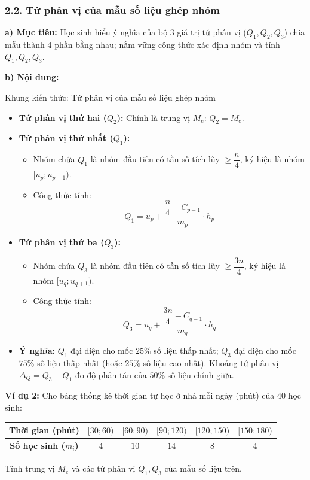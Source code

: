 \documentclass[12pt, a4paper]{article}
\begin{document}
\subsubsection*{2.2. Tứ phân vị của mẫu số liệu ghép nhóm}

\noindent \textbf{a) Mục tiêu:}
Học sinh hiểu ý nghĩa của bộ 3 giá trị tứ phân vị ($Q_1, Q_2, Q_3$) chia mẫu thành 4 phần bằng nhau; nắm vững công thức xác định nhóm và tính $Q_1, Q_2, Q_3$.

\noindent \textbf{b) Nội dung:}
\begin{pedabox}{Khung kiến thức: Tứ phân vị của mẫu số liệu ghép nhóm}
\begin{itemize}[leftmargin=0.6cm]
    \item \textbf{Tứ phân vị thứ hai ($Q_2$):} Chính là trung vị $M_e$: $Q_2 = M_e$.
    \item \textbf{Tứ phân vị thứ nhất ($Q_1$):}
    \begin{itemize}
        \item Nhóm chứa $Q_1$ là nhóm đầu tiên có tần số tích lũy $\ge \dfrac{n}{4}$, ký hiệu là nhóm $[u_p; u_{p+1})$.
        \item Công thức tính:
        $$Q_1 = u_p + \dfrac{\dfrac{n}{4} - C_{p-1}}{m_p} \cdot h_p$$
    \end{itemize}
    \item \textbf{Tứ phân vị thứ ba ($Q_3$):}
    \begin{itemize}
        \item Nhóm chứa $Q_3$ là nhóm đầu tiên có tần số tích lũy $\ge \dfrac{3n}{4}$, ký hiệu là nhóm $[u_q; u_{q+1})$.
        \item Công thức tính:
        $$Q_3 = u_q + \dfrac{\dfrac{3n}{4} - C_{q-1}}{m_q} \cdot h_q$$
    \end{itemize}
    \item \textbf{Ý nghĩa:} $Q_1$ đại diện cho mốc $25\%$ số liệu thấp nhất; $Q_3$ đại diện cho mốc $75\%$ số liệu thấp nhất (hoặc $25\%$ số liệu cao nhất). Khoảng tứ phân vị $\Delta_Q = Q_3 - Q_1$ đo độ phân tán của $50\%$ số liệu chính giữa.
\end{itemize}
\end{pedabox}

\textbf{Ví dụ 2:} Cho bảng thống kê thời gian tự học ở nhà mỗi ngày (phút) của $40$ học sinh:
\begin{center}
\small
\begin{tabular}{|c|c|c|c|c|c|}
\hline
\textbf{Thời gian (phút)} & $[30; 60)$ & $[60; 90)$ & $[90; 120)$ & $[120; 150)$ & $[150; 180)$ \\ \hline
\textbf{Số học sinh ($m_i$)} & $4$ & $10$ & $14$ & $8$ & $4$ \\ \hline
\end{tabular}
\end{center}
Tính trung vị $M_e$ và các tứ phân vị $Q_1, Q_3$ của mẫu số liệu trên.
\end{document}
